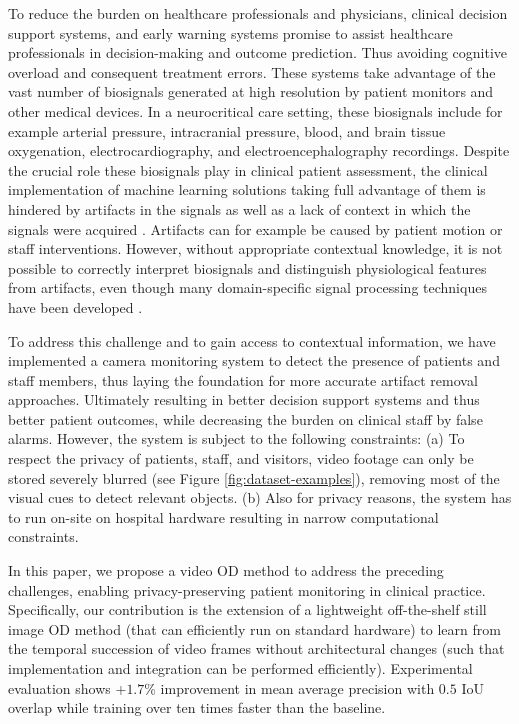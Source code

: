 \documentclass[conference]{IEEEtran}
\begin{document}
To reduce the burden on healthcare professionals and physicians, clinical decision support systems, and early warning systems promise to assist healthcare professionals in decision-making and outcome prediction. Thus avoiding cognitive overload and consequent treatment errors.
These systems take advantage of the vast number of biosignals generated at high resolution by patient monitors and other medical devices.
In a neurocritical care setting, these biosignals include for example arterial pressure, intracranial pressure, blood, and brain tissue oxygenation, electrocardiography, and electroencephalography recordings.
Despite the crucial role these biosignals play in clinical patient assessment, the clinical implementation of machine learning solutions taking full advantage of them is hindered by artifacts in the signals as well as a lack of context in which the signals were acquired \cite{elezi2020exploiting}.
Artifacts can for example be caused by patient motion or staff interventions.
However, without appropriate contextual knowledge, it is not possible to correctly interpret biosignals and distinguish physiological features from artifacts, even though many domain-specific signal processing techniques have been developed \cite{Islam2021}.

To address this challenge and to gain access to contextual information, we have implemented a camera monitoring system to detect the presence of patients and staff members, thus laying the foundation for more accurate artifact removal approaches.
Ultimately resulting in better decision support systems and thus better patient outcomes, while decreasing the burden on clinical staff by false alarms.
However, the system is subject to the following constraints:
    (a) To respect the privacy of patients, staff, and visitors, video footage can only be stored severely blurred (see Figure \ref{fig:dataset-examples}), removing most of the visual cues to detect relevant objects.
    (b) Also for privacy reasons, the system has to run on-site on hospital hardware resulting in narrow computational constraints.

In this paper, we propose a video OD method to address the preceding challenges, enabling privacy-preserving patient monitoring in clinical practice.
Specifically, our contribution is the extension of a lightweight off-the-shelf still image OD method (that can efficiently run on standard hardware) to learn from the temporal succession of video frames without architectural changes (such that implementation and integration can be performed efficiently).
Experimental evaluation shows +$1.7$\% improvement in mean average precision with $0.5$ IoU overlap while training over ten times faster than the baseline.
\end{document}

